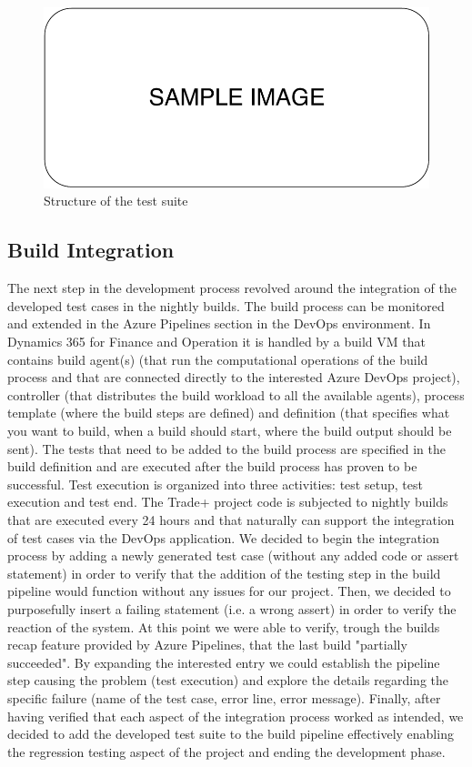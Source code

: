\begin{figure}[ht]
	\centering
	\includegraphics[scale=0.7]{Images/SampleImage.pdf}
	\caption{Structure of the test suite}
	\label{fig:syTestSuite}
\end{figure}

\subsection{Build Integration}

The next step in the development process revolved around the integration of the developed test cases in the nightly builds. The build process can be monitored and extended in the Azure Pipelines section in the DevOps environment. In Dynamics 365 for Finance and Operation it is handled by a build VM that contains build agent(s) (that run the computational operations of the build process and that are connected directly to the interested Azure DevOps project), controller (that distributes the build workload to all the available agents), process template (where the build steps are defined) and definition (that specifies what you want to build, when a build should start, where the build output should be sent). The tests that need to be added to the build process are specified in the build definition and are executed after the build process has proven to be successful. Test execution is organized into three activities: test setup, test execution and test end. The Trade+ project code is subjected to nightly builds that are executed every 24 hours and that naturally can support the integration of test cases via the DevOps application. We decided to begin the integration process by adding a newly generated test case (without any added code or assert statement) in order to verify that the addition of the testing step in the build pipeline would function without any issues for our project. Then, we decided to purposefully insert a failing statement (i.e. a wrong assert) in order to verify the reaction of the system. At this point we were able to verify, trough the builds recap feature provided by Azure Pipelines, that the last build "partially succeeded". By expanding the interested entry we could establish the pipeline step causing the problem (test execution) and explore the details regarding the specific failure (name of the test case, error line, error message). Finally, after having verified that each aspect of the integration process worked as intended, we decided to add the developed test suite to the build pipeline effectively enabling the regression testing aspect of the project and ending the development phase.

